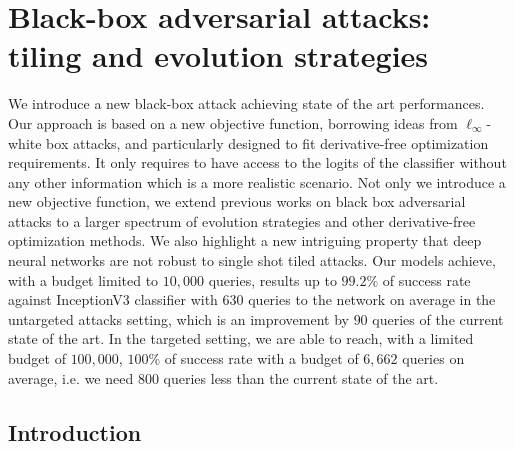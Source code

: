 \chapter{Black-box adversarial attacks: tiling and evolution strategies}


\newcommand{\fix}{\marginpar{FIX}}
\newcommand{\new}{\marginpar{NEW}}

\newcommand{\nico}[1]{{\color{blue} #1}}

\def\fixme#1{\textcolor{red}{[#1]}\marginpar{\hspace*{-5pt}\textcolor{red}{FIXME}}}


We introduce a new black-box attack achieving state of the art performances. Our approach is based on a new objective function, borrowing ideas from $\ell_\infty$-white box attacks, and particularly designed to fit derivative-free optimization requirements. It only requires to have access to the logits of the classifier without any other information which is a more realistic scenario.  Not only we introduce a new objective function, we extend previous works on black box adversarial attacks to a larger spectrum of evolution strategies and other derivative-free optimization methods. We also highlight a new intriguing property that deep neural networks are not robust to single shot tiled attacks. Our models achieve, with a budget limited to $10,000$ queries, results up to $99.2\%$ of success rate against InceptionV3 classifier  with $630$  queries to the network on average in the untargeted attacks setting, which is an improvement by $90$ queries of  the current state of the art. In the targeted setting, we are able to reach, with a limited budget of $100,000$, $100\%$ of success rate with a budget of $6,662$ queries on average, i.e. we need $800$ queries less than the current state of the art.




\section{Introduction}

